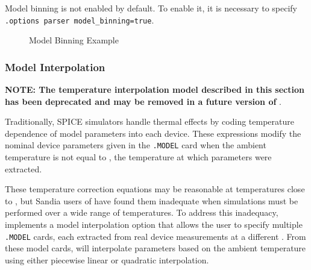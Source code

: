 Model binning is not enabled by default.  To enable it, it is necessary to 
specify \texttt{.options parser model\_binning=true}.

\begin{figure}[htbp]
  \begin{centering}
\caption[Model Binning Example]
{Model Binning Example\label{binningExample} }
\end{centering}
\end{figure}

\subsubsection{Model Interpolation}
\label{Model_Interpolation}

\textbf{NOTE:  The temperature interpolation model described in this section has been deprecated and may be removed in a future version of \Xyce{}}.

Traditionally, SPICE simulators handle thermal effects by coding
temperature dependence of model parameters into each device.  These
expressions modify the nominal device parameters given in
the \texttt{.MODEL} card when the ambient temperature is not equal
to , the temperature at which parameters were extracted.

These temperature correction equations may be reasonable at temperatures close
to , but Sandia users of \Xyce{} have found them inadequate when
simulations must be performed over a wide range of temperatures.  To address
this inadequacy, \Xyce{} implements a model interpolation option that allows
the user to specify multiple \texttt{.MODEL} cards, each extracted from real
device measurements at a different .  From these model cards,
\Xyce{} will interpolate parameters based on the ambient temperature using
either piecewise linear or quadratic interpolation.

